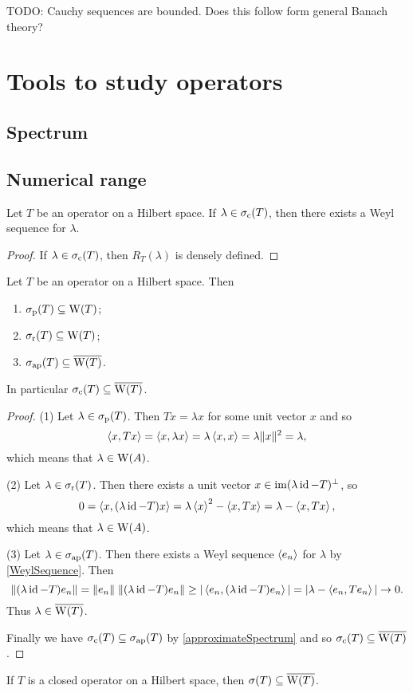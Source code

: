 TODO: Cauchy sequences are bounded. Does this follow form general Banach theory?


\section{Tools to study operators}
\subsection{Spectrum}
\subsection{Numerical range}
\begin{lemma}
Let $T$ be an operator on a Hilbert space. If $\lambda\in\sigma_\text{c}(T)$, then there exists a Weyl sequence for $\lambda$. 
\end{lemma}
\begin{proof}
If $\lambda\in\sigma_\text{c}(T)$, then $R_T(\lambda)$ is densely defined.
\end{proof}

\begin{proposition} \label{spectralInclusionNumericalRange}
Let $T$ be an operator on a Hilbert space. Then
\begin{enumerate}
\item $\sigma_\text{p}(T)\subseteq \operatorname{W}(T)$;
\item $\sigma_\text{r}(T) \subseteq \operatorname{W}(T)$;
\item $\sigma_\text{ap}(T) \subseteq \overline{\operatorname{W}(T)}$.
\end{enumerate}
In particular $\sigma_\text{c}(T) \subseteq \overline{\operatorname{W}(T)}$.
\end{proposition}
\begin{proof}
(1) Let $\lambda \in \sigma_\text{p}(T)$. Then $Tx = \lambda x$ for some unit vector $x$ and so
\[ \left\langle x,Tx \right\rangle = \left\langle x,\lambda x \right\rangle = \lambda \left\langle x,x \right\rangle = \lambda\lVert x\rVert^2 = \lambda, \]
which means that $\lambda \in \operatorname{W}(A)$.

(2) Let $\lambda \in \sigma_\text{r}(T)$. Then there exists a unit vector $x \in \operatorname{im}(\lambda\operatorname{id} - T)^\perp$, so
\[ 0 = \left\langle x,(\lambda\operatorname{id}-T)x \right\rangle = \lambda\left\langle x \right\rangle^2 - \left\langle x,Tx \right\rangle = \lambda - \left\langle x,Tx \right\rangle, \]
which means that $\lambda \in \operatorname{W}(A)$.

(3) Let $\lambda \in \sigma_\text{ap}(T)$. Then there exists a Weyl sequence $\left\langle e_n \right\rangle$ for $\lambda$ by \ref{WeylSequence}. Then
\[ \lVert(\lambda\operatorname{id} - T)e_n\rVert = \lVert e_n\rVert\;\lVert(\lambda\operatorname{id} - T)e_n\rVert \geq |\left\langle e_n, (\lambda\operatorname{id} - T)e_n \right\rangle| = |\lambda - \left\langle e_n,Te_n \right\rangle| \to 0. \]
Thus $\lambda\in\overline{\operatorname{W}(T)}$.

Finally we have $\sigma_\text{c}(T)\subseteq\sigma_\text{ap}(T)$ by \ref{approximateSpectrum} and so $\sigma_\text{c}(T)\subseteq\overline{\operatorname{W}(T)}$.
\end{proof}
\begin{corollary}
If $T$ is a closed operator on a Hilbert space, then $\sigma(T)\subseteq \overline{\operatorname{W}(T)}$.
\end{corollary}


